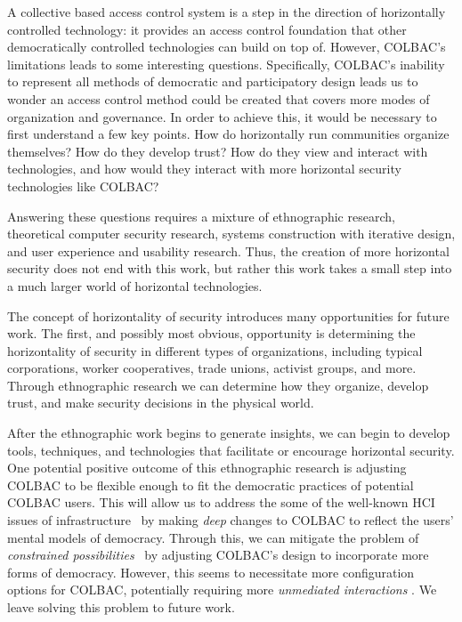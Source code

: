 A collective based access control system is a step in the direction of
horizontally controlled technology: it provides an access control foundation
that other democratically controlled technologies can build on top of. However,
COLBAC's limitations leads to some interesting questions. Specifically, COLBAC's
inability to represent all methods of democratic and participatory design leads
us to wonder an access control method could be created that covers more modes of
organization and governance. In order to achieve this, it would be necessary to
first understand a few key points. How do horizontally run communities organize
themselves? How do they develop trust? How do they view and interact with
technologies, and how would they interact with more horizontal security
technologies like COLBAC?

Answering these questions requires a mixture of ethnographic research,
theoretical computer security research, systems construction with iterative
design, and user experience and usability research. Thus, the creation of more
horizontal security does not end with this work, but rather this work takes a
small step into a much larger world of horizontal technologies.

The concept of horizontality of security introduces many opportunities for
future work. The first, and possibly most obvious, opportunity is determining
the horizontality of security in different types of organizations, including
typical corporations, worker cooperatives, trade unions, activist groups, and
more. Through ethnographic research we can determine how they organize, develop
trust, and make security decisions in the physical world.

After the ethnographic work begins to generate insights, we can begin to develop
tools, techniques, and technologies that facilitate or encourage horizontal
security. One potential positive outcome of this ethnographic research is
adjusting COLBAC to be flexible enough to fit the democratic practices of
potential COLBAC users. This will allow us to address the some of the well-known
HCI issues of infrastructure~\cite{edwards2010infrastructure} by making
\textit{deep} changes to COLBAC to reflect the users' mental models of
democracy. Through this, we can mitigate the problem of \textit{constrained
possibilities}~\cite{edwards2010infrastructure} by adjusting COLBAC's design to
incorporate more forms of democracy. However, this seems to necessitate more
configuration options for COLBAC, potentially requiring more \textit{unmediated
interactions} \cite{edwards2010infrastrcuture}. We leave solving this problem
to future work.


